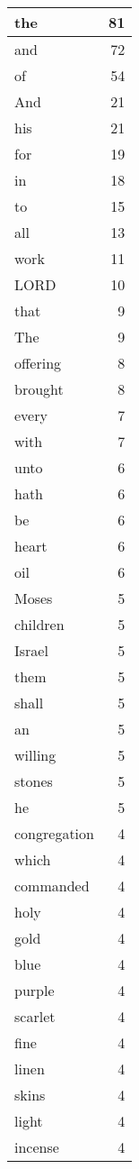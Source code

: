 \begin{center}
\begin{longtable}{l|r}
\hline \hline
\endlastfoot
the & 81 \\ \hline
and & 72 \\ \hline
of & 54 \\ \hline
And & 21 \\ \hline
his & 21 \\ \hline
for & 19 \\ \hline
in & 18 \\ \hline
to & 15 \\ \hline
all & 13 \\ \hline
work & 11 \\ \hline
LORD & 10 \\ \hline
that & 9 \\ \hline
The & 9 \\ \hline
offering & 8 \\ \hline
brought & 8 \\ \hline
every & 7 \\ \hline
with & 7 \\ \hline
unto & 6 \\ \hline
hath & 6 \\ \hline
be & 6 \\ \hline
heart & 6 \\ \hline
oil & 6 \\ \hline
Moses & 5 \\ \hline
children & 5 \\ \hline
Israel & 5 \\ \hline
them & 5 \\ \hline
shall & 5 \\ \hline
an & 5 \\ \hline
willing & 5 \\ \hline
stones & 5 \\ \hline
he & 5 \\ \hline
congregation & 4 \\ \hline
which & 4 \\ \hline
commanded & 4 \\ \hline
holy & 4 \\ \hline
gold & 4 \\ \hline
blue & 4 \\ \hline
purple & 4 \\ \hline
scarlet & 4 \\ \hline
fine & 4 \\ \hline
linen & 4 \\ \hline
skins & 4 \\ \hline
light & 4 \\ \hline
incense & 4 \\ \hline

\end{longtable}
\end{center}
